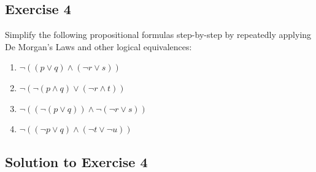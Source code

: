 \documentclass[11pt]{article}
\begin{document}
    \subsection*{Exercise 4}

    Simplify the following propositional formulas step-by-step by repeatedly applying De Morgan's Laws and other logical equivalences:

    \begin{enumerate}
        \item $\neg ((p \vee q) \wedge (\neg r \vee s))$

        \item $\neg (\neg(p \wedge q) \vee (\neg r \wedge t))$

        \item $\neg ((\neg(p \vee q)) \wedge \neg(\neg r \vee s))$

        \item $\neg ((\neg p \vee q) \wedge (\neg t \vee \neg u))$
    \end{enumerate}

    \subsection*{Solution to Exercise 4}
\end{document}
